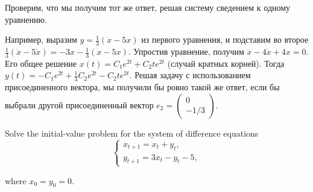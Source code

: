 \begin{solution}
Проверим, что мы получим тот же ответ, решая систему сведением к одному уравнению.

Например, выразим $y=\frac{1}{3} (\dot{x}-5x)$ из первого уравнения, и подставим во второе $\frac{1}{3} (\ddot{x}-5\dot{x})=-3x-\frac{1}{3} (\dot{x}-5x)$. Упростив уравнение, получим $\ddot{x}-4\dot{x}+4x=0$. Его общее решение $x(t)=C_{1} e^{2t} +C_{2} te^{2t} $ (случай кратных корней). Тогда $y(t)=-C_{1} e^{2t} +\frac{1}{3} C_{2} e^{2t} -C_{2} te^{2t} $. Решая задачу с использованием присоединенного вектора, мы получили бы ровно такой же ответ, если бы выбрали другой присоединенный вектор $e_{2} =\left(\begin{array}{c} {0} \\ {-1/3} \end{array}\right)$.
\end{solution}


\begin{problem}
Solve the initial-value problem for the system of difference equations 
\[
\begin{cases} 
x_{t+1} =x_{t} +y_{t} , \\ 
y_{t+1} =3x_{t} -y_{t} -5,
\end{cases}
\]

where $x_{0} =y_{0} =0$.
\end{problem}

